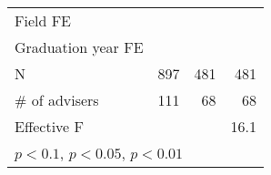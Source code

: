 {\begin{tabular}{l*{3}{D{.}{.}{-1}}}
\addlinespace
Field FE                      	&     \checkmark         	&     \checkmark         	&     \checkmark         \\
\addlinespace
Graduation year FE            	&     \checkmark         	&     \checkmark         	&     \checkmark         \\
\midrule
N                             	&            897         	&            481         	&            481         \\
\# of advisers                	&            111         	&             68         	&             68         \\
Effective F                   	&                        	&                        	&           16.1         \\
\bottomrule
{}\\
\end{tabular}
}
